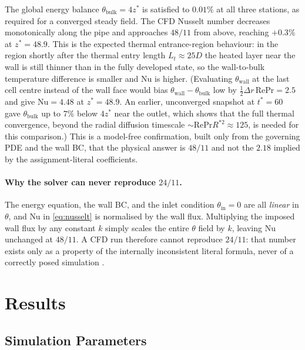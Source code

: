 \documentclass[12pt,a4paper]{article}
\newcommand{\Rey}{\text{Re}}
\newcommand{\Pran}{\text{Pr}}
\begin{document}
The global energy balance $\theta_{\text{bulk}}=4z^*$ is satisfied to $0.01\%$ at all three
stations, as required for a converged steady field. The CFD Nusselt number decreases
monotonically along the pipe and approaches $48/11$ from above, reaching $+0.3\%$ at
$z^*=48.9$. This is the expected thermal entrance-region behaviour: in the region shortly
after the thermal entry length $L_t\approx25D$ the heated layer near the wall is still thinner
than in the fully developed state, so the wall-to-bulk temperature difference is smaller and
$\text{Nu}$ is higher. (Evaluating $\theta_{\text{wall}}$ at the last cell centre instead of the
wall face would bias $\theta_{\text{wall}}-\theta_{\text{bulk}}$ low by
$\tfrac12\Delta r\,\Rey\Pran=2.5$ and give $\text{Nu}=4.48$ at $z^*=48.9$. An earlier,
unconverged snapshot at $t^*=60$ gave $\theta_{\text{bulk}}$ up to $7\%$ below $4z^*$ near the
outlet, which shows that the full thermal convergence, beyond the radial diffusion timescale
$\sim\Rey\Pran R^{*2}\approx125$, is needed for this comparison.) This is a model-free
confirmation, built only from the governing PDE and the wall BC, that the physical answer is
$48/11$ and not the $2.18$ implied by the assignment-literal coefficients.

\paragraph{Why the solver can never reproduce $24/11$.} The energy equation, the wall BC, and the
inlet condition $\theta_{\text{in}}=0$ are all \emph{linear} in $\theta$, and $\text{Nu}$ in
\eqref{eq:nusselt} is normalised by the wall flux. Multiplying the imposed wall flux by any
constant $k$ simply scales the entire $\theta$ field by $k$, leaving $\text{Nu}$ unchanged at
$48/11$. A CFD run therefore cannot reproduce $24/11$: that number exists only as a property of
the internally inconsistent literal formula, never of a correctly posed simulation
\cite{ShahLondon1978,Incropera,KaysCrawford,BirdStewartLightfoot}.

\newpage

\section{Results}

\subsection{Simulation Parameters}
\end{document}
